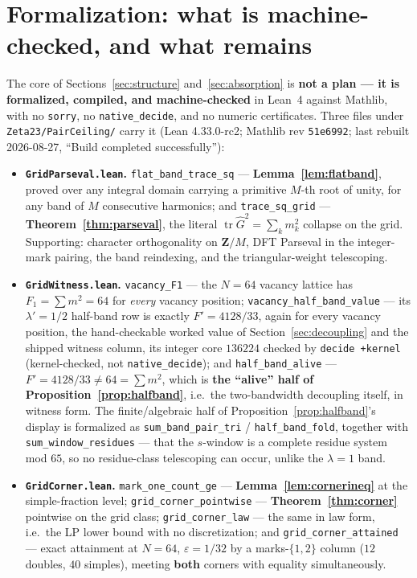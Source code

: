 \documentclass[11pt]{article}
\theoremstyle{plain}
\theoremstyle{definition}
\theoremstyle{remark}
\newcommand{\Z}{\mathbf{Z}}
\newcommand{\Gh}{\widehat{G}}
\newcommand{\tr}{\operatorname{tr}}
\begin{document}
\section{Formalization: what is machine-checked, and what remains}
\label{sec:formalization}

The core of Sections~\ref{sec:structure} and~\ref{sec:absorption} is
\textbf{not a plan --- it is formalized, compiled, and machine-checked} in
Lean~4 against Mathlib, with no \texttt{sorry}, no \texttt{native\_decide}, and
no numeric certificates. Three files under
\texttt{Zeta23/}\allowbreak\texttt{PairCeiling/} carry it (Lean 4.33.0-rc2;
Mathlib rev \texttt{51e6992}; last rebuilt 2026-08-27, ``Build completed
successfully''):

\begin{itemize}
\item \textbf{\texttt{GridParseval.lean}.} \texttt{flat\_band\_trace\_sq} ---
  \textbf{Lemma~\ref{lem:flatband}}, proved over any integral domain carrying a
  primitive $M$-th root of unity, for any band of $M$ consecutive harmonics; and
  \texttt{trace\_sq\_grid} --- \textbf{Theorem~\ref{thm:parseval}}, the literal
  $\tr \Gh^2 = \sum_k m_k^2$ collapse on the grid. Supporting: character
  orthogonality on $\Z/M$, DFT Parseval in the integer-mark pairing, the band
  reindexing, and the triangular-weight telescoping.
\item \textbf{\texttt{GridWitness.lean}.} \texttt{vacancy\_F1} --- the $N = 64$
  vacancy lattice has $F_1 = \sum m^2 = 64$ for \emph{every} vacancy position;
  \texttt{vacancy\_half\_band\_value} --- its $\lambda' = 1/2$ half-band row is
  exactly \textbf{$F' = 4128/33$}, again for every vacancy position, the
  hand-checkable worked value of Section~\ref{sec:decoupling} and the shipped
  witness column, its integer core $136224$ checked by \texttt{decide +kernel}
  (kernel-checked, not \texttt{native\_decide}); and \texttt{half\_band\_alive}
  --- $F' = 4128/33 \ne 64 = \sum m^2$, which is \textbf{the ``alive'' half of
  Proposition~\ref{prop:halfband}}, i.e.\ the two-bandwidth decoupling itself, in
  witness form. The finite/algebraic half of Proposition~\ref{prop:halfband}'s
  display is formalized as \texttt{sum\_band\_pair\_tri} /
  \texttt{half\_band\_fold}, together with \texttt{sum\_window\_residues} ---
  that the $s$-window is a complete residue system mod $65$, so no
  residue-class telescoping can occur, unlike the $\lambda = 1$ band.
\item \textbf{\texttt{GridCorner.lean}.} \texttt{mark\_one\_count\_ge} ---
  \textbf{Lemma~\ref{lem:cornerineq}} at the simple-fraction level;
  \texttt{grid\_corner\_pointwise} --- \textbf{Theorem~\ref{thm:corner}}
  pointwise on the grid class; \texttt{grid\_corner\_law} --- the same in law
  form, i.e.\ the LP lower bound with no discretization; and
  \texttt{grid\_corner\_attained} --- exact attainment at $N = 64$,
  $\varepsilon = 1/32$ by a marks-$\{1, 2\}$ column ($12$ doubles, $40$ simples),
  meeting \textbf{both} corners with equality simultaneously.
\end{itemize}
\end{document}
